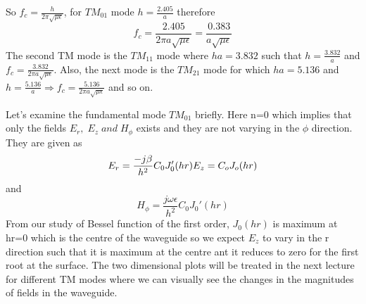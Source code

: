 So $f_c =\frac{h}{2\pi\sqrt{\mu\epsilon}}$, for $TM_{01}$ mode $h=\frac{2.405}{a}$ therefore 
$$f_c=\frac{2.405}{2\pi a\sqrt{\mu\epsilon}} =\frac{0.383}{a\sqrt{\mu\epsilon}}$$
The second TM mode is the $TM_{11}$ mode where $ha =3.832$ such that $h=\frac{3.832}{a}$ and $f_c=\frac{3.832}{2\pi a\sqrt{\mu\epsilon}}$. Also, the next mode is the $TM_{21}$ mode for which $ha =5.136$ and $h=\frac{5.136}{a} \Longrightarrow f_c=\frac{5.136}{2\pi a \sqrt{\mu\epsilon}}$ and so on. 

Let's examine the fundamental mode $TM_{01}$ briefly. Here n=0 which implies that only the fields $E_r, \; E_z \; and \; H_\phi$ exists and they are not varying in the $\phi$ direction. They are given as
$$E_r=\frac{-j\beta}{h^2}C_0J_0'(hr)\\
    E_z=C_oJ_o(hr)$$
and
$$H_\phi=\frac{j\omega\epsilon}{h^2}C_0J_0'(hr)$$   
From our study of Bessel function of the first order, $J_0(hr)$ is maximum at hr=0 which is the centre of the waveguide so we expect $E_z$ to vary in the r direction such that it is maximum at the centre ant it reduces to zero for the first root at the surface. The two dimensional plots will be treated in the next lecture for different TM modes where we can visually see the changes in the magnitudes of fields in the waveguide.